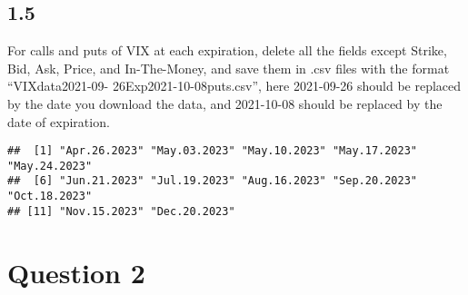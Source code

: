 \documentclass[
]{article}
\newenvironment{Shaded}{\begin{snugshade}}{\end{snugshade}}
\newcommand{\AttributeTok}[1]{\textcolor[rgb]{0.77,0.63,0.00}{#1}}
\newcommand{\ControlFlowTok}[1]{\textcolor[rgb]{0.13,0.29,0.53}{\textbf{#1}}}
\newcommand{\DecValTok}[1]{\textcolor[rgb]{0.00,0.00,0.81}{#1}}
\newcommand{\FunctionTok}[1]{\textcolor[rgb]{0.00,0.00,0.00}{#1}}
\newcommand{\NormalTok}[1]{#1}
\newcommand{\OtherTok}[1]{\textcolor[rgb]{0.56,0.35,0.01}{#1}}
\newcommand{\SpecialCharTok}[1]{\textcolor[rgb]{0.00,0.00,0.00}{#1}}
\newcommand{\StringTok}[1]{\textcolor[rgb]{0.31,0.60,0.02}{#1}}
\begin{document}
\hypertarget{section-4}{%
\subsection{1.5}\label{section-4}}

For calls and puts of VIX at each expiration, delete all the fields
except Strike, Bid, Ask, Price, and In-The-Money, and save them in .csv
files with the format ``VIXdata2021-09- 26Exp2021-10-08puts.csv'', here
2021-09-26 should be replaced by the date you download the data, and
2021-10-08 should be replaced by the date of expiration.

\begin{Shaded}
\end{Shaded}

\begin{verbatim}
##  [1] "Apr.26.2023" "May.03.2023" "May.10.2023" "May.17.2023" "May.24.2023"
##  [6] "Jun.21.2023" "Jul.19.2023" "Aug.16.2023" "Sep.20.2023" "Oct.18.2023"
## [11] "Nov.15.2023" "Dec.20.2023"
\end{verbatim}

\hypertarget{question-2}{%
\section{Question 2}\label{question-2}}
\end{document}
